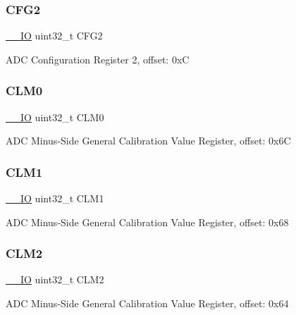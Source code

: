 \subsubsection{\texorpdfstring{CFG2}{CFG2}}
{\footnotesize\ttfamily \mbox{\hyperlink{core__cm0plus_8h_aec43007d9998a0a0e01faede4133d6be}{\+\_\+\+\_\+\+IO}} uint32\+\_\+t C\+F\+G2}

A\+DC Configuration Register 2, offset\+: 0xC \mbox{\label{struct_a_d_c___type_a387c7f0803d309215cb3a8e950a3306e}} 
\subsubsection{\texorpdfstring{CLM0}{CLM0}}
{\footnotesize\ttfamily \mbox{\hyperlink{core__cm0plus_8h_aec43007d9998a0a0e01faede4133d6be}{\+\_\+\+\_\+\+IO}} uint32\+\_\+t C\+L\+M0}

A\+DC Minus-\/\+Side General Calibration Value Register, offset\+: 0x6C \mbox{\label{struct_a_d_c___type_af1f1f4e8be5d496b5ee572702254ca97}} 
\subsubsection{\texorpdfstring{CLM1}{CLM1}}
{\footnotesize\ttfamily \mbox{\hyperlink{core__cm0plus_8h_aec43007d9998a0a0e01faede4133d6be}{\+\_\+\+\_\+\+IO}} uint32\+\_\+t C\+L\+M1}

A\+DC Minus-\/\+Side General Calibration Value Register, offset\+: 0x68 \mbox{\label{struct_a_d_c___type_a4711a30f2fd22f8aeab7f895a48e23e5}} 
\subsubsection{\texorpdfstring{CLM2}{CLM2}}
{\footnotesize\ttfamily \mbox{\hyperlink{core__cm0plus_8h_aec43007d9998a0a0e01faede4133d6be}{\+\_\+\+\_\+\+IO}} uint32\+\_\+t C\+L\+M2}

A\+DC Minus-\/\+Side General Calibration Value Register, offset\+: 0x64 \mbox{\label{struct_a_d_c___type_a1cc2d6954ca002237cf69c29c4c8fdaf}} 

